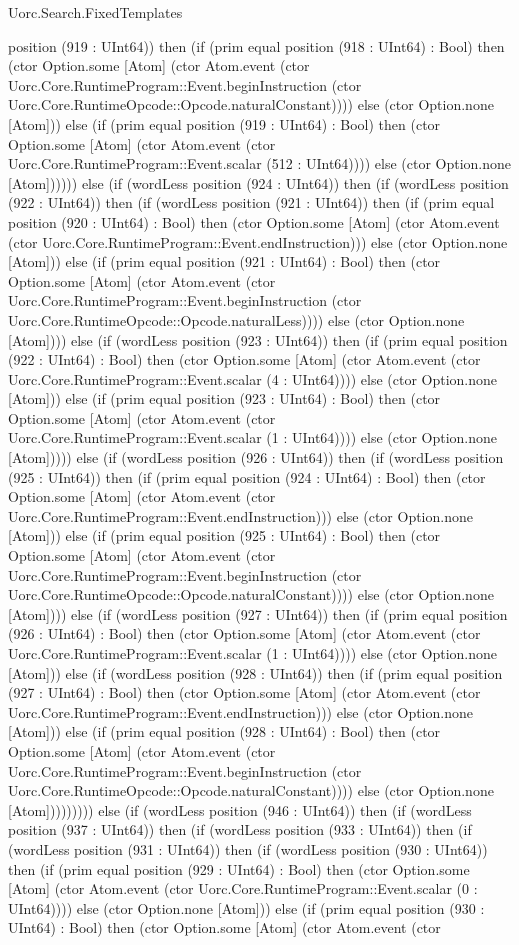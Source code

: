 \begin{lexlean}{Uorc.Search.FixedTemplates}
\begin{semanticmodule}
{position (919 : UInt64)) then (if (prim equal position (918 : UInt64) : Bool) then (ctor Option.some [Atom] (ctor Atom.event (ctor Uorc.Core.RuntimeProgram::Event.beginInstruction (ctor Uorc.Core.RuntimeOpcode::Opcode.naturalConstant)))) else (ctor Option.none [Atom])) else (if (prim equal position (919 : UInt64) : Bool) then (ctor Option.some [Atom] (ctor Atom.event (ctor Uorc.Core.RuntimeProgram::Event.scalar (512 : UInt64)))) else (ctor Option.none [Atom]))))) else (if (wordLess position (924 : UInt64)) then (if (wordLess position (922 : UInt64)) then (if (wordLess position (921 : UInt64)) then (if (prim equal position (920 : UInt64) : Bool) then (ctor Option.some [Atom] (ctor Atom.event (ctor Uorc.Core.RuntimeProgram::Event.endInstruction))) else (ctor Option.none [Atom])) else (if (prim equal position (921 : UInt64) : Bool) then (ctor Option.some [Atom] (ctor Atom.event (ctor Uorc.Core.RuntimeProgram::Event.beginInstruction (ctor Uorc.Core.RuntimeOpcode::Opcode.naturalLess)))) else (ctor Option.none [Atom]))) else (if (wordLess position (923 : UInt64)) then (if (prim equal position (922 : UInt64) : Bool) then (ctor Option.some [Atom] (ctor Atom.event (ctor Uorc.Core.RuntimeProgram::Event.scalar (4 : UInt64)))) else (ctor Option.none [Atom])) else (if (prim equal position (923 : UInt64) : Bool) then (ctor Option.some [Atom] (ctor Atom.event (ctor Uorc.Core.RuntimeProgram::Event.scalar (1 : UInt64)))) else (ctor Option.none [Atom])))) else (if (wordLess position (926 : UInt64)) then (if (wordLess position (925 : UInt64)) then (if (prim equal position (924 : UInt64) : Bool) then (ctor Option.some [Atom] (ctor Atom.event (ctor Uorc.Core.RuntimeProgram::Event.endInstruction))) else (ctor Option.none [Atom])) else (if (prim equal position (925 : UInt64) : Bool) then (ctor Option.some [Atom] (ctor Atom.event (ctor Uorc.Core.RuntimeProgram::Event.beginInstruction (ctor Uorc.Core.RuntimeOpcode::Opcode.naturalConstant)))) else (ctor Option.none [Atom]))) else (if (wordLess position (927 : UInt64)) then (if (prim equal position (926 : UInt64) : Bool) then (ctor Option.some [Atom] (ctor Atom.event (ctor Uorc.Core.RuntimeProgram::Event.scalar (1 : UInt64)))) else (ctor Option.none [Atom])) else (if (wordLess position (928 : UInt64)) then (if (prim equal position (927 : UInt64) : Bool) then (ctor Option.some [Atom] (ctor Atom.event (ctor Uorc.Core.RuntimeProgram::Event.endInstruction))) else (ctor Option.none [Atom])) else (if (prim equal position (928 : UInt64) : Bool) then (ctor Option.some [Atom] (ctor Atom.event (ctor Uorc.Core.RuntimeProgram::Event.beginInstruction (ctor Uorc.Core.RuntimeOpcode::Opcode.naturalConstant)))) else (ctor Option.none [Atom])))))))) else (if (wordLess position (946 : UInt64)) then (if (wordLess position (937 : UInt64)) then (if (wordLess position (933 : UInt64)) then (if (wordLess position (931 : UInt64)) then (if (wordLess position (930 : UInt64)) then (if (prim equal position (929 : UInt64) : Bool) then (ctor Option.some [Atom] (ctor Atom.event (ctor Uorc.Core.RuntimeProgram::Event.scalar (0 : UInt64)))) else (ctor Option.none [Atom])) else (if (prim equal position (930 : UInt64) : Bool) then (ctor Option.some [Atom] (ctor Atom.event (ctor }
\end{semanticmodule}
\end{lexlean}
